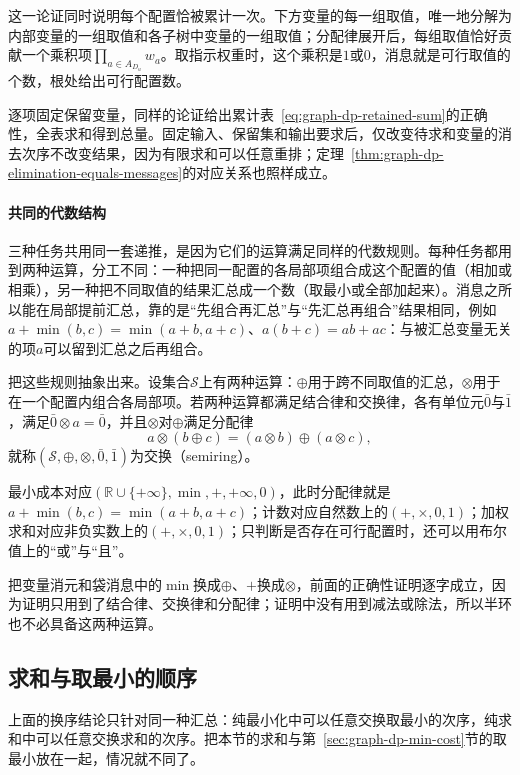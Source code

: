 这一论证同时说明每个配置恰被累计一次。下方变量的每一组取值，唯一地分解为内部变量的一组取值和各子树中变量的一组取值；分配律展开后，每组取值恰好贡献一个乘积项$\prod_{a\in A_{D_u}}w_a$。取指示权重时，这个乘积是$1$或$0$，消息就是可行取值的个数，根处给出可行配置数。

逐项固定保留变量，同样的论证给出累计表~\eqref{eq:graph-dp-retained-sum}的正确性，全表求和得到总量。固定输入、保留集和输出要求后，仅改变待求和变量的消去次序不改变结果，因为有限求和可以任意重排；定理~\ref{thm:graph-dp-elimination-equals-messages}的对应关系也照样成立。

\paragraph{共同的代数结构}
三种任务共用同一套递推，是因为它们的运算满足同样的代数规则。每种任务都用到两种运算，分工不同：一种把同一配置的各局部项组合成这个配置的值（相加或相乘），另一种把不同取值的结果汇总成一个数（取最小或全部加起来）。消息之所以能在局部提前汇总，靠的是“先组合再汇总”与“先汇总再组合”结果相同，例如$a+\min(b,c)=\min(a+b,a+c)$、$a(b+c)=ab+ac$：与被汇总变量无关的项$a$可以留到汇总之后再组合。

把这些规则抽象出来。设集合$\mathcal S$上有两种运算：$\oplus$用于跨不同取值的汇总，$\otimes$用于在一个配置内组合各局部项。若两种运算都满足结合律和交换律，各有单位元$\bar0$与$\bar1$，满足$\bar0\otimes a=\bar0$，并且$\otimes$对$\oplus$满足分配律
\[
a\otimes(b\oplus c)=(a\otimes b)\oplus(a\otimes c),
\]
就称$(\mathcal S,\allowbreak\oplus,\allowbreak\otimes,\allowbreak\bar0,\allowbreak\bar1)$为交换（semiring）。

最小成本对应$(\mathbb R\cup\{+\infty\},\allowbreak\min,\allowbreak+,\allowbreak+\infty,\allowbreak0)$，此时分配律就是$a+\min(b,c)=\min(a+b,a+c)$；计数对应自然数上的$(+,\times,0,1)$；加权求和对应非负实数上的$(+,\times,0,1)$；只判断是否存在可行配置时，还可以用布尔值上的“或”与“且”。

把变量消元和袋消息中的$\min$换成$\oplus$、$+$换成$\otimes$，前面的正确性证明逐字成立，因为证明只用到了结合律、交换律和分配律；证明中没有用到减法或除法，所以半环也不必具备这两种运算。

\subsection{求和与取最小的顺序}
\label{sec:graph-dp-mixed-order}

上面的换序结论只针对同一种汇总：纯最小化中可以任意交换取最小的次序，纯求和中可以任意交换求和的次序。把本节的求和与第~\ref{sec:graph-dp-min-cost}节的取最小放在一起，情况就不同了。

